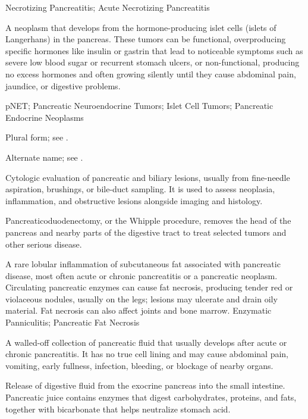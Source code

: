 \synonyms
Necrotizing Pancreatitis; Acute Necrotizing Pancreatitis

 A neoplasm that develops from the hormone-producing islet cells (islets of Langerhans) in the pancreas. These tumors can be functional, overproducing specific hormones like insulin or gastrin that lead to noticeable symptoms such as severe low blood sugar or recurrent stomach ulcers, or non-functional, producing no excess hormones and often growing silently until they cause abdominal pain, jaundice, or digestive problems.

\synonyms
pNET; Pancreatic Neuroendocrine Tumors; Islet Cell Tumors; Pancreatic Endocrine Neoplasms

 Plural form; see .

 Alternate name; see .

 Cytologic evaluation of pancreatic and biliary lesions, usually from fine-needle aspiration, brushings, or bile-duct sampling. It is used to assess neoplasia, inflammation, and obstructive lesions alongside imaging and histology.

 Pancreaticoduodenectomy, or the Whipple procedure, removes the head of the pancreas and nearby parts of the digestive tract to treat selected tumors and other serious disease.

 A rare lobular inflammation of subcutaneous fat associated with pancreatic disease, most often acute
or chronic pancreatitis or a pancreatic neoplasm. Circulating pancreatic enzymes can cause fat
necrosis, producing tender red or violaceous nodules, usually on the legs; lesions may ulcerate
and drain oily material. Fat necrosis can also affect joints and bone marrow.
\synonyms
Enzymatic Panniculitis; Pancreatic Fat Necrosis

 A walled-off collection of pancreatic fluid that usually develops after acute or chronic pancreatitis. It has no true cell lining and may cause abdominal pain, vomiting, early fullness, infection, bleeding, or blockage of nearby organs.

 Release of digestive fluid from the exocrine pancreas into the small intestine. Pancreatic juice contains enzymes that digest carbohydrates, proteins, and fats, together with bicarbonate that helps neutralize stomach acid.

